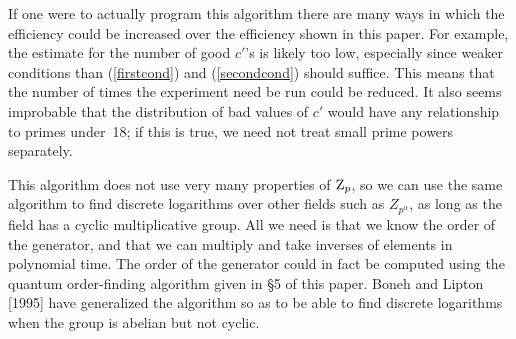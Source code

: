 If one were to actually program this algorithm 
there are many ways in which the efficiency
could be increased over the efficiency shown in this paper.  
For example, the estimate for the number of good $c'$'s is likely too low, 
especially since weaker conditions than (\ref{firstcond}) and 
(\ref{secondcond}) should suffice.
This means that the number of times the experiment need be run could be
reduced.  It also
seems improbable that the distribution of bad values of $c'$ would have any 
relationship to primes under~18; if this is true,
we need not treat small prime powers separately.

This algorithm does not use very many properties of ${\rm Z}_p$, so we can
use the same algorithm to find discrete logarithms over other fields
such as $Z_{p^\alpha}$, as long as the field has a cyclic multiplicative 
group.   All we need is that we know the order of the 
generator, and that we can multiply and take inverses of elements in 
polynomial time.   The order of the generator could in fact be computed
using the quantum order-finding algorithm given in \S5 of this paper.
Boneh and Lipton [1995] have generalized the algorithm so as to be able to
find discrete logarithms when the group is abelian but not cyclic.

